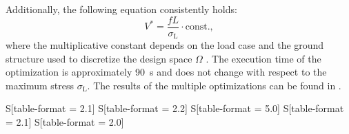 Additionally, the following equation consistently holds:
\begin{equation} \label{eq:03_V_star}
    V^*=\frac{fL}{\sigma_\text{L}}\cdot \text{const.},
\end{equation}
where the multiplicative constant depends on the load case and the ground structure used to discretize the design space $\Omega$ . The execution time of the optimization is approximately \qty{90}{\second} and does not change with respect to the maximum stress $\sigma_\text{L}$. The results of the multiple optimizations can be found in .

\begin{table}[]
    \centering
    \begin{tabular}{S[table-format = 2.1]
                    S[table-format = 2.2]
                    S[table-format = 5.0]
                    S[table-format = 2.1]                    
                    S[table-format = 2.0]}
        

\end{tabular}
\end{table}
